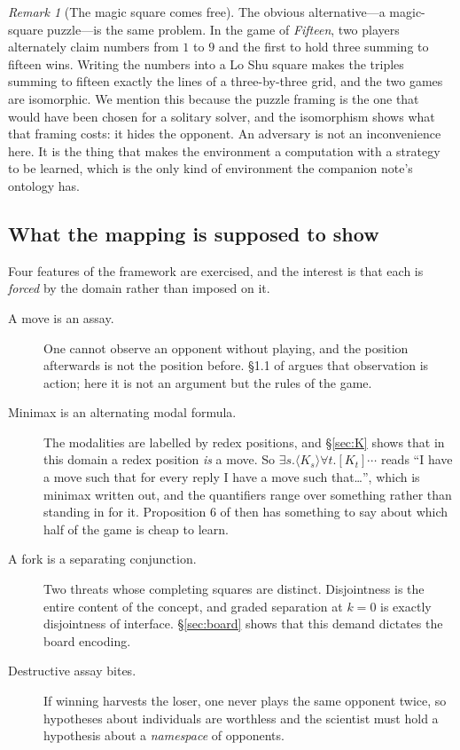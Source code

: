 \documentclass[11pt]{article}
\theoremstyle{definition}
\theoremstyle{plain}
\theoremstyle{remark}
\newtheorem{remark}[definition]{Remark}
\begin{document}
\begin{remark}[The magic square comes free]
The obvious alternative---a magic-square puzzle---is the same problem. In the
game of \emph{Fifteen}, two players alternately claim numbers from $1$ to $9$
and the first to hold three summing to fifteen wins. Writing the numbers into a
Lo Shu square makes the triples summing to fifteen exactly the lines of a
three-by-three grid, and the two games are isomorphic. We mention this because
the puzzle framing is the one that would have been chosen for a solitary
solver, and the isomorphism shows what that framing costs: it hides the
opponent. An adversary is not an inconvenience here. It is the thing that makes
the environment a computation with a strategy to be learned, which is the only
kind of environment the companion note's ontology has.
\end{remark}

\subsection{What the mapping is supposed to show}

Four features of the framework are exercised, and the interest is that each is
\emph{forced} by the domain rather than imposed on it.

\begin{description}
\item[A move is an assay.] One cannot observe an opponent without playing, and
  the position afterwards is not the position before. \S1.1 of \cite{scientist}
  argues that observation is action; here it is not an argument but the rules of
  the game.
\item[Minimax is an alternating modal formula.] The modalities are labelled by
  redex positions, and \S\ref{sec:K} shows that in this domain a redex position
  \emph{is} a move. So $\exists s.\langle K_s\rangle \forall t. [K_t]\cdots$
  reads ``I have a move such that for every reply I have a move
  such that\ldots'', which is minimax written out, and the quantifiers range
  over something rather than standing in for it. Proposition 6 of
  \cite{scientist} then has something to say about which half of the game is
  cheap to learn.
\item[A fork is a separating conjunction.] Two threats whose completing squares
  are distinct. Disjointness is the entire content of the concept, and graded
  separation at $k=0$ is exactly disjointness of interface. \S\ref{sec:board}
  shows that this demand dictates the board encoding.
\item[Destructive assay bites.] If winning harvests the loser, one never plays
  the same opponent twice, so hypotheses about individuals are worthless and the
  scientist must hold a hypothesis about a \emph{namespace} of opponents.
\end{description}
\end{document}

